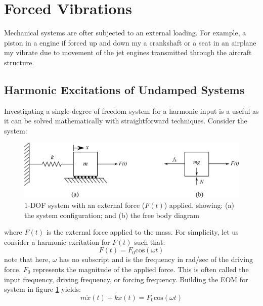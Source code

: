\documentclass[12pt,letter]{article}
\numberwithin{ex}{section} %
\numberwithin{re}{section} %
\begin{document}
	\large{}
	
	\setcounter{section}{2}
		\section{Forced Vibrations}

			Mechanical systems are ofter subjected to an external loading. For example, a piston in a engine if forced up and down my a crankshaft or a seat in an airplane my vibrate due to movement of the jet engines transmitted through the aircraft structure. 
			
		\subsection{Harmonic Excitations of Undamped Systems}

			
			Investigating a single-degree of freedom system for a harmonic input is a useful as it can be solved mathematically with straightforward techniques. Consider the system:
			\begin{figure}[H]
				\centering
				\includegraphics[]{../Figures/1-DOF-spring_mass_horizontal_forced_FBD.png}
				\caption{1-DOF system with an external force ($F(t)$) applied, showing: (a) the system configuration; and (b) the free body diagram}
				\label{fig:1-DOF-spring_mass_horizontal_forced_FBD}
			\end{figure}	
			\noindent where $F(t)$ is the external force applied to the mass. For simplicity, let us consider a harmonic excitation for $F(t)$ such that:
			\begin{equation}
				F(t) = F_0\text{cos}(\omega t)
			\end{equation}							
			note that here, $\omega$ has no subscript and is the frequency in rad/sec of the driving force. $F_0$ represents the magnitude of the applied force. This is often called the input frequency, driving frequency, or forcing frequency. Building the EOM for system in figure \ref{fig:1-DOF-spring_mass_horizontal_forced_FBD} yields:
			\begin{equation}
				m \ddot{x}(t)+kx(t) = F_0\text{cos}(\omega t)
			\end{equation}			
\end{document}
